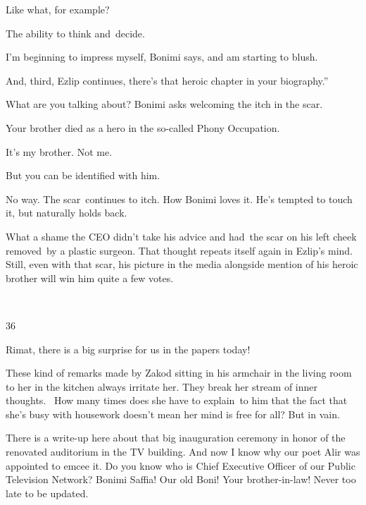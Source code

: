 \documentclass[letterpaper]{article}
\begin{document}
{\textquotedbl}Like what, for example?{\textquotedbl} 

{\textquotedbl}The ability to think and~decide.{\textquotedbl} 

{\textquotedbl}I'm beginning to impress myself,{\textquotedbl} Bonimi says, {\textquotedbl}and am starting to
blush.{\textquotedbl} 

{\textquotedbl}And, third,{\textquotedbl} Ezlip continues, {\textquotedbl}there's that heroic chapter in your
biography.''

{\textquotedbl}What are you talking about?{\textquotedbl} Bonimi asks welcoming the itch in the scar.~

{\textquotedbl}Your brother died as a hero in the so-called Phony Occupation.{\textquotedbl} 

{\textquotedbl}It's my brother. Not me.{\textquotedbl} 

{\textquotedbl}But you can be identified with him.{\textquotedbl} 

{\textquotedbl}No way.{\textquotedbl} The scar\ continues to itch. How Bonimi loves it. He's tempted to touch it, but
naturally holds back.\ \ 

What a shame the CEO didn't take his advice and had\ the scar on his left cheek removed~by a plastic surgeon. That
thought repeats itself again in Ezlip's mind. Still, even with that scar, his picture in the media alongside mention of
his heroic brother will win him quite a few votes.

~

36 

{\textquotedbl}Rimat, there is a big surprise for us in the papers today!{\textquotedbl}

These kind of remarks made by Zakod sitting in his armchair in the living room to her in the kitchen always irritate
her. They break her stream of inner thoughts. \textcolor[rgb]{0.30980393,0.5058824,0.7411765}{\ }How many times does
she have to explain\textcolor[rgb]{0.0,0.6901961,0.9411765}{\ }to him that the fact that she's busy with housework
doesn't mean her mind is free for all? But in vain. 

{\textquotedbl}There is a write-up here about that big inauguration ceremony in honor of the renovated auditorium in the
TV building. And now I know why our poet Alir was appointed to emcee it. Do you know who is Chief Executive Officer of
our Public Television Network? Bonimi Saffia! Our old Boni! Your brother-in-law! Never too late to be
updated.{\textquotedbl} 
\end{document}
